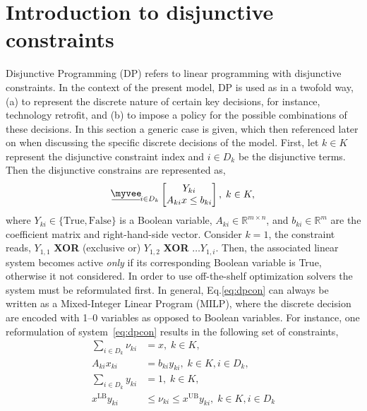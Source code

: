 \documentclass{amsart}
\newcommand{\myveebar}{\mathbin{\vcenter{\hbox{$ \underline{\mkern-2.4mu{\myvee}\mkern-2.4mu} $}}}}
\begin{document}
\section{Introduction to disjunctive constraints}\label{sec:DP}
%
Disjunctive Programming (DP) refers to linear programming with disjunctive
constraints. In the context of the present model, DP is used as in a twofold
way, (a) to represent the discrete nature of certain key decisions, for
instance, technology retrofit, and (b) to impose a policy for the possible
combinations of these decisions.  In this section a generic case is given, which
then referenced later on when discussing the specific discrete decisions of the
model. First, let $k\in K$ represent the disjunctive constraint index and $i\in
D_k$ be the disjunctive terms. Then the disjunctive constrains are represented
as,
%
\begin{equation}\label{eq:dpcon}
    \myveebar_{i \in D_k}
    \begin{bmatrix}
        Y_{ki} \\
        A_{ki} x \leq b_{ki}
    \end{bmatrix}, \; k\in K,
\end{equation}
%
where $Y_{ki}\in\{\text{True}, \text{False}\}$ is a Boolean variable, $A_{ki}\in
\mathbb{R}^{m\times n}$, and $b_{ki}\in \mathbb{R}^{m}$ are the coefficient
matrix and right-hand-side vector. Consider $k=1$, the constraint reads,
$Y_{1,1}$ \textbf{XOR} (exclusive or) $Y_{1,2}$ \textbf{XOR} $\dots Y_{1,i}$. 
Then, the associated linear system becomes active \emph{only} if its
corresponding Boolean variable is True, otherwise it not considered.
%
In order to use off-the-shelf optimization solvers the system must be
reformulated first. In general, Eq.\eqref{eq:dpcon} can always be written as a
Mixed-Integer Linear Program (MILP), where the discrete decision are encoded
with 1--0 variables as opposed to Boolean variables.  For instance, one
reformulation of system~\eqref{eq:dpcon} results in the following set of
constraints,
%
\begin{equation}\label{eq:convex_hull}
    \begin{split}
        \sum_{i\in D_k} \nu_{ki} &= x, \; k\in K, \\
        A_{ki} x_{ki} &= b_{ki} y_{ki}, \; k\in K, i\in D_k, \\
        \sum_{i\in D_k} y_{ki} &= 1, \; k\in K, \\
        x^{\text{LB}}y_{ki} &\leq \nu_{ki} \leq x^{\text{UB}}y_{ki},
        \; k\in K, i\in D_k\\
    \end{split}
\end{equation}
\end{document}
